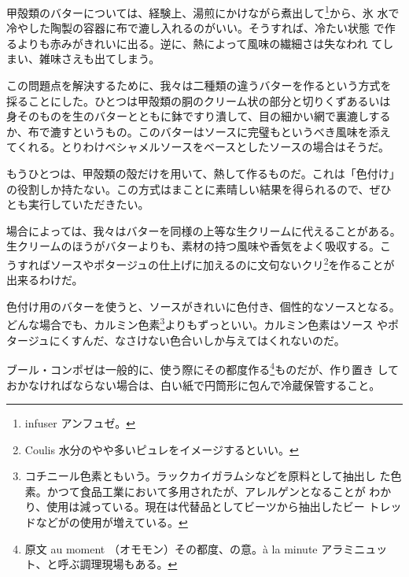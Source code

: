 甲殻類のバターについては、経験上、湯煎にかけながら煮出して\footnote{infuser
  アンフュゼ。}から、氷
水で冷やした陶製の容器に布で漉し入れるのがいい。そうすれば、冷たい状態
で作るよりも赤みがきれいに出る。逆に、熱によって風味の繊細さは失なわれ
てしまい、雑味さえも出てしまう。

この問題点を解決するために、我々は二種類の違うバターを作るという方式を
採ることにした。ひとつは甲殻類の胴のクリーム状の部分と切りくずあるいは
身そのものを生のバターとともに鉢ですり潰して、目の細かい網で裏漉しする
か、布で漉すというもの。このバターはソースに完璧もというべき風味を添え
てくれる。とりわけベシャメルソースをベースとしたソースの場合はそうだ。

もうひとつは、甲殻類の殻だけを用いて、熱して作るものだ。これは「色付け」
の役割しか持たない。この方式はまことに素晴しい結果を得られるので、ぜひ
とも実行していただきたい。

場合によっては、我々はバターを同様の上等な生クリームに代えることがある。
生クリームのほうがバターよりも、素材の持つ風味や香気をよく吸収する。こ
うすればソースやポタージュの仕上げに加えるのに文句ないクリ\footnote{Coulis
  水分のやや多いピュレをイメージするといい。}を作ることが 出来るわけだ。

色付け用のバターを使うと、ソースがきれいに色付き、個性的なソースとなる。
どんな場合でも、カルミン色素\footnote{コチニール色素ともいう。ラックカイガラムシなどを原料として抽出し
  た色素。かつて食品工業において多用されたが、アレルゲンとなることが
  わかり、使用は減っている。現在は代替品としてビーツから抽出したビー
  トレッドなどがの使用が増えている。}よりもずっといい。カルミン色素はソース
やポタージュにくすんだ、なさけない色合いしか与えてはくれないのだ。

ブール・コンポゼは一般的に、使う際にその都度作る\footnote{原文 au moment
  （オモモン）その都度、の意。à la minute アラミニュッ
  ト、と呼ぶ調理現場もある。}ものだが、作り置き
しておかなければならない場合は、白い紙で円筒形に包んで冷蔵保管すること。
